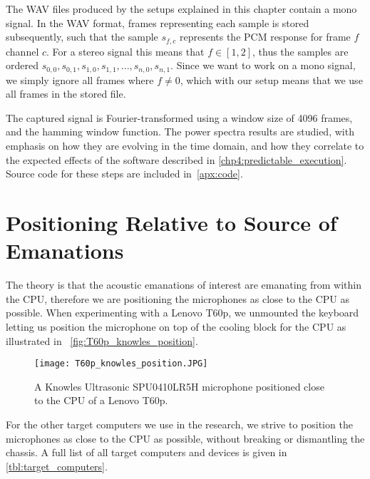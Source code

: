 
The \gls{WAV} files produced by the setups explained in this chapter contain a mono signal. 
In the \gls{WAV} format, frames representing each sample is stored subsequently, such that the sample \( s_{f,c} \) represents the \gls{PCM} response for frame \( f \) channel \( c \).
For a stereo signal this means that \( f \in \left [ 1, 2 \right ] \), thus the samples are ordered  \( s_{0,0}, s_{0,1}, s_{1,0}, s_{1,1}, ... , s_{n,0}, s_{n,1} \).
Since we want to work on a mono signal, we simply ignore all frames where \( f \neq 0 \), which with our setup means that we use all frames in the stored file.

The captured signal is Fourier-transformed using a window size of 4096 frames, and the hamming window function. The power spectra results are studied, with emphasis on how they are evolving in the time domain, and how they correlate to the expected effects of the software described in \autoref{chp4:predictable_execution}.
Source code for these steps are included in~\autoref{apx:code}.

\section{Positioning Relative to Source of Emanations}\label{chp3:sec:capturing_audio_fingerprint}
The theory is that the acoustic emanations of interest are emanating from within the \gls{CPU}, therefore we are positioning the microphones as close to the \gls{CPU} as possible. 
When experimenting with a Lenovo T60p, we unmounted the keyboard letting us position the microphone on top of the cooling block for the \gls{CPU} as illustrated in ~\autoref{fig:T60p_knowles_position}.

\begin{figure}[ht]
  \centering
  \texttt{[image: T60p\_knowles\_position.JPG]}
  \caption{A Knowles Ultrasonic SPU0410LR5H microphone positioned close to the CPU of a Lenovo T60p.}
  \label{fig:T60p_knowles_position}
\end{figure}

For the other target computers we use in the research, we strive to position the microphones as close to the CPU as possible, without breaking or dismantling the chassis.
A full list of all target computers and devices is given in \autoref{tbl:target_computers}.


